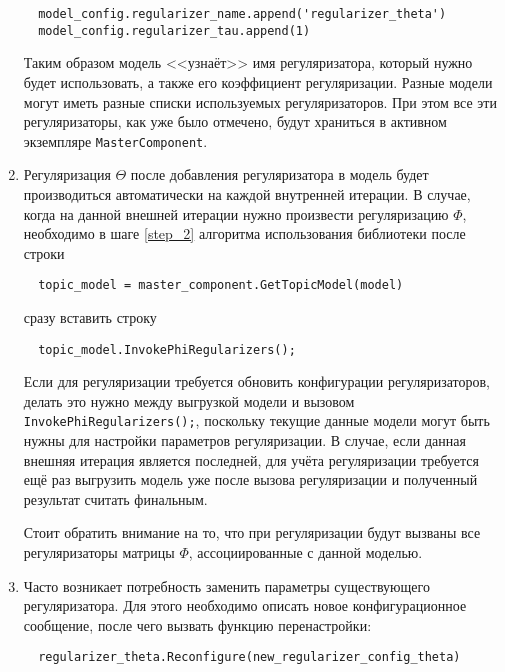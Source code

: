 \begin{enumerate}
	\vspace{4pt}	
	\verb|  model_config.regularizer_name.append('regularizer_theta')| \\
	\verb|  model_config.regularizer_tau.append(1)|
	\vspace{4pt}	
		
	Таким образом модель <<узнаёт>> имя регуляризатора, который нужно будет использовать, а также его коэффициент регуляризации. Разные модели могут иметь разные списки используемых регуляризаторов. При этом все эти регуляризаторы, как уже было отмечено, будут храниться в активном экземпляре \verb|MasterComponent|.
	
	\item Регуляризация $\Theta$ после добавления регуляризатора в модель будет производиться автоматически на каждой внутренней итерации. В случае, когда на данной внешней итерации нужно произвести регуляризацию $\Phi$, необходимо в шаге \ref{step_2} алгоритма использования библиотеки после строки
	
	\vspace{4pt}	
	\verb|  topic_model = master_component.GetTopicModel(model)|
	\vspace{4pt}	
	
	сразу вставить строку 
	
	\vspace{4pt}	
	\verb|  topic_model.InvokePhiRegularizers();|
	\vspace{4pt}		
	
	Если для регуляризации требуется обновить конфигурации регуляризаторов, делать это нужно между выгрузкой модели и вызовом \verb|InvokePhiRegularizers();|, поскольку текущие данные модели могут быть нужны для настройки параметров регуляризации. В случае, если данная внешняя итерация является последней, для учёта регуляризации требуется ещё раз выгрузить модель уже после вызова регуляризации и полученный результат считать финальным.
	
	Стоит обратить внимание на то, что при регуляризации будут вызваны все регуляризаторы матрицы $\Phi$, ассоциированные с данной моделью.
	
	\item Часто возникает потребность заменить параметры существующего регуляризатора. Для этого необходимо описать новое конфигурационное сообщение, после чего вызвать функцию перенастройки:
	
	\vspace{4pt}	
	\verb|  regularizer_theta.Reconfigure(new_regularizer_config_theta)|
	\vspace{4pt}
	

\end{enumerate}
